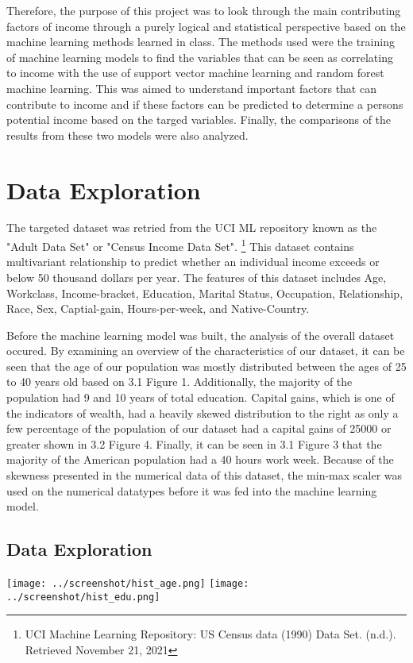 \documentclass[12pt]{article}
\begin{document}
\begin{multicols*}{2}
\hspace*{5mm} Therefore, the purpose of this project was to look through the main contributing factors of income through a purely logical
and statistical perspective based on the machine learning methods learned in class. The methods used were the training of machine learning models to find the variables 
that can be seen as correlating to income with the use of support vector machine learning and random forest machine learning. This was aimed to understand
important factors that can contribute to income and if these factors can be predicted to determine a persons potential income based on the targed variables. Finally,
the comparisons of the results from these two models were also analyzed. 

\section{Data Exploration} 
\hspace*{5mm} The targeted dataset was retried from the UCI ML repository known as the "Adult Data Set" or "Census Income Data Set". \footnote[3]{UCI Machine Learning Repository: US Census data (1990) Data Set. (n.d.). Retrieved November 21, 2021}
This dataset contains multivariant relationship to predict whether an individual income exceeds or below 50 thousand dollars per year. The features of this dataset
includes Age, Workclass, Income-bracket, Education, Marital Status, Occupation, Relationship, Race, Sex, Captial-gain, Hours-per-week, and Native-Country. 

\hspace*{5mm} Before the machine learning model was built, the analysis of the overall dataset occured. By examining an overview of the characteristics of our dataset,
it can be seen that the age of our population was mostly distributed between the ages of 25 to 40 years old based on 3.1 Figure 1. Additionally, the majority of the population had 9 and 10 years of 
total education. Capital gains, which is one of the indicators of wealth, had a heavily skewed distribution to the right as only a few percentage of the population of our dataset 
had a capital gains of 25000 or greater shown in 3.2 Figure 4. Finally, it can be seen in 3.1 Figure 3 that the majority of the American population had a 40 hours work week. Because of the skewness presented
in the numerical data of this dataset, the min-max scaler was used on the numerical datatypes before it was fed into the machine learning model. 
\subsection{Data Exploration}
  \begin{center}
	\texttt{[image: ../screenshot/hist\_age.png]}
	\texttt{[image: ../screenshot/hist\_edu.png]}



\end{center}
\end{multicols*}
\end{document}
